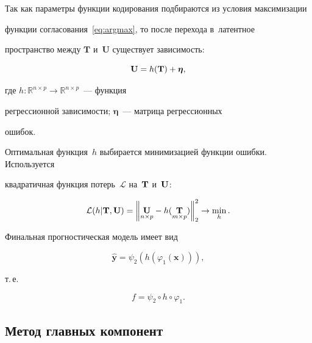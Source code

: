 Так как параметры функции кодирования подбираются из условия максимизации 

функции согласования~\eqref{eq:argmax}, то после перехода в~латентное 

пространство между $\mathbf{T}$ и~$\mathbf{U}$ существует зависимость:

\begin{equation*}

    \bU = h(\bT) +  \boldsymbol{\eta},


\end{equation*}

где $h: \mathbb{R}^{n \times p} \to \mathbb{R}^{n \times p}$~--- функция 

регрессионной зависимости;  $\boldsymbol{\eta}$~--- матрица регрессионных 

ошибок.

Оптимальная функция~$h$ выбирается минимизацией функции ошибки. Используется 

квадратичная функция потерь~$\mathcal{L}$ на~$\mathbf{T}$ и~$\mathbf{U}$:

\begin{equation*}

    \mathcal{L}(h | {\bT}, {\bU}) = {\left\| \underset{n \times p}{\bU}  - 

h(\underset{m \times p}{\bT}) \right\| }_2^2 \rightarrow\min_{h}.


\end{equation*}



Финальная прогностическая модель имеет вид

$$

\widehat{\mathbf{y}} = \psi_2\left(h(\varphi_1(\mathbf{x}))\right),

$$

 т.\,е.\

\begin{equation*}

    f = \psi_2 \circ h \circ \varphi_1.


\end{equation*}



\subsection{Метод главных компонент}



